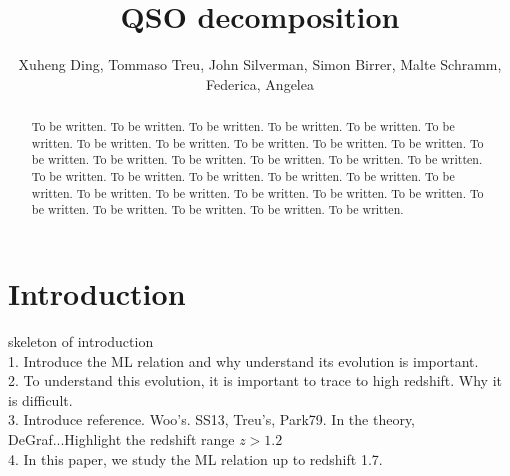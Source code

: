 \documentclass[apj]{emulateapj}
\begin{document}
\def\lcdm{$\Lambda$CDM}
\def\hst{{\it HST}}
\def\efr{$R_{\mathrm{eff}}$}
\def\galfit{\sc Galfit}
\def\mbh{$\mathcal M_{\rm BH}$}
\def\lhost{$L_{\rm host}$}
\def\jcap{Journal of Cosmology and Astroparticle Physics}
\def\halpha{${\it H}\alpha$}
\def\hbeta{${\it H}\beta$}
\def\sersic{S\'ersic}
\def\lenstronomy{{\sc Lenstronomy}}
\def\Reff{{$R_{\mathrm{eff}}$}}
\def\kms{km~s$^{\rm -1}$}


\title{QSO decomposition}

\author{Xuheng Ding, Tommaso Treu, John Silverman, Simon Birrer, Malte Schramm, Federica, Angelea
 }


\begin{abstract}
To be written. To be written. To be written. To be written. To be written. To be written. To be written. To be written. To be written. To be written. To be written. To be written. To be written. To be written. To be written. To be written. To be written. To be written. To be written. To be written. To be written. To be written. To be written. To be written. To be written. To be written. To be written. To be written. To be written. To be written. To be written. To be written. To be written. 
\end{abstract}


\section{Introduction}
\label{sec:introduction}
skeleton of introduction
\\
1. Introduce the ML relation and why understand its evolution is important.\\
2. To understand this evolution, it is important to trace to high redshift. Why it is difficult.\\
3. Introduce reference. Woo's. SS13, Treu's, Park79. In the theory, DeGraf...Highlight the redshift range $z>1.2$\\
4. In this paper, we study the ML relation up to redshift 1.7.
\end{document}
